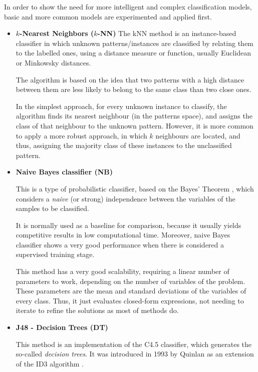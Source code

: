 \documentclass[a4paper,10pt,onecolumn,preprint,3p]{elsarticle}
\begin{document}
In order to show the need for more intelligent and complex classification models, basic and more common models are experimented and applied first. 
\begin{itemize}

\item \textbf{$k$-Nearest Neighbors ($k$-NN)}
The kNN \cite{Aha1991,Mitchell1997} method is an instance-based classifier in 
which unknown patterns/instances are classified by relating them to the labelled ones, using a distance measure or function, usually Euclidean or Minkowsky distances.

The algorithm is based on the idea that two patterns with a high distance between them are less likely to belong to the same class than two close ones.

In the simplest approach, for every unknown instance to classify, the algorithm finds its nearest neighbour (in the patterns space), and assigns the class of that neighbour to the unknown pattern.
However, it is more common to apply a more robust approach, in which $k$ neighbours are located, and thus, assigning the majority class of these instances to the unclassified pattern.

\item \textbf{Naive Bayes classifier (NB)}

This is a type of probabilistic classifier, based on the Bayes' Theorem \cite{AI-book_Bayes}, which considers a \textit{naive} (or strong) independence between the variables of the samples to be classified.

It is normally used as a baseline for comparison, because it usually yields competitive results in low computational time. Moreover, naive Bayes classifier shows a very good performance when there is considered a supervised training stage.

This method has a very good scalability, requiring a linear number of parameters to work, depending on the number of variables of the problem. These parameters are the mean and standard deviations of the variables of every class.
Thus, it just evaluates closed-form expressions, not needing to iterate to refine the solutions as most of methods do.


\item \textbf{J48 - Decision Trees (DT)}

This method is an implementation of the C4.5 classifier, which generates the so-called \textit{decision trees}. It was introduced in 1993 by Quinlan \cite{Quinlan1993} as an extension of the ID3 algorithm \cite{Mitchell1997}. 


\end{itemize}
\end{document}
